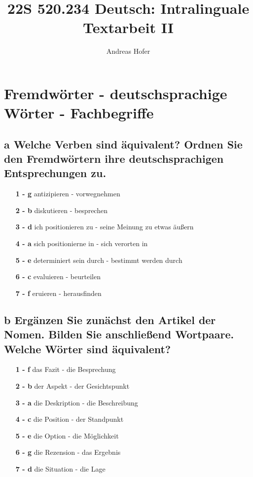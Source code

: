 \documentclass{article}
\title{\vspace{-3cm}22S 520.234 Deutsch: Intralinguale Textarbeit II}
\author{Andreas Hofer}
\begin{document}
	\section{Fremdwörter - deutschsprachige Wörter - Fachbegriffe}
	\subsection*{\textbf{a}  Welche Verben sind äquivalent? Ordnen Sie den Fremdwörtern ihre deutschsprachigen Entsprechungen zu.}
	\begin{itemize}
		\item[\textbf{1 - g}]{antizipieren - vorwegnehmen}
		\item[\textbf{2 - b}]{diskutieren - besprechen}
		\item[\textbf{3 - d}]{ich positionieren zu - seine Meinung zu etwas äußern}
		\item[\textbf{4 - a}]{sich positionierne in - sich verorten in}
		\item[\textbf{5 - e}]{determiniert sein durch - bestimmt werden durch}
		\item[\textbf{6 - c}]{evaluieren - beurteilen}
		\item[\textbf{7 - f}]{eruieren - herausfinden}
	\end{itemize}
	\subsection*{\textbf{b}  Ergänzen Sie zunächst den Artikel der Nomen. Bilden Sie anschließend Wortpaare. Welche Wörter sind äquivalent?}
	\begin{itemize}
		\item[\textbf{1 - f}]{das Fazit - die Besprechung}
		\item[\textbf{2 - b}]{der Aspekt - der Gesichtspunkt}
		\item[\textbf{3 - a}]{die Deskription - die Beschreibung}
		\item[\textbf{4 - c}]{die Position - der Standpunkt}
		\item[\textbf{5 - e}]{die Option - die Möglichkeit}
		\item[\textbf{6 - g}]{die Rezension - das Ergebnis}
		\item[\textbf{7 - d}]{die Situation - die Lage}
	\end{itemize}
\end{document}
